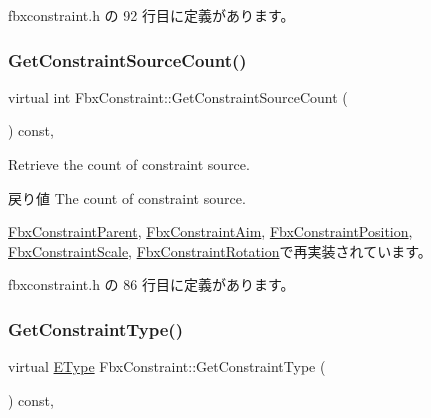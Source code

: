  fbxconstraint.\+h の 92 行目に定義があります。

\mbox{\label{class_fbx_constraint_aa702f86c6a1832ce3b4905911e66c58f}} 
\subsubsection{\texorpdfstring{Get\+Constraint\+Source\+Count()}{GetConstraintSourceCount()}}
{\footnotesize\ttfamily virtual int Fbx\+Constraint\+::\+Get\+Constraint\+Source\+Count (\begin{DoxyParamCaption}{ }\end{DoxyParamCaption}) const\hspace{0.3cm}{\ttfamily [inline]}, {\ttfamily [virtual]}}

Retrieve the count of constraint source. \begin{DoxyReturn}{戻り値}
The count of constraint source. 
\end{DoxyReturn}


\hyperlink{class_fbx_constraint_parent_aa7747054ebeee0f94ce907451f648497}{Fbx\+Constraint\+Parent}, \hyperlink{class_fbx_constraint_aim_aa58f34b660f30caff3f89c5372a25a5c}{Fbx\+Constraint\+Aim}, \hyperlink{class_fbx_constraint_position_a5f6c49200df6a7a1fe704084c2b56e09}{Fbx\+Constraint\+Position}, \hyperlink{class_fbx_constraint_scale_a5c4500706618751078dddca3652ce936}{Fbx\+Constraint\+Scale}, \hyperlink{class_fbx_constraint_rotation_ab27178d5b53654eb9f41f6e3f3a4c5dc}{Fbx\+Constraint\+Rotation}で再実装されています。



 fbxconstraint.\+h の 86 行目に定義があります。

\mbox{\label{class_fbx_constraint_adbeea66a1a605531a019aa6df90dc45b}} 
\subsubsection{\texorpdfstring{Get\+Constraint\+Type()}{GetConstraintType()}}
{\footnotesize\ttfamily virtual \hyperlink{class_fbx_constraint_a49c1634663395eab7c28856df233ec66}{E\+Type} Fbx\+Constraint\+::\+Get\+Constraint\+Type (\begin{DoxyParamCaption}{ }\end{DoxyParamCaption}) const\hspace{0.3cm}{\ttfamily [inline]}, {\ttfamily [virtual]}}

